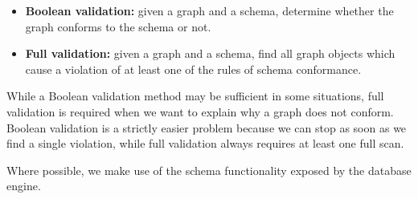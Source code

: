 \documentclass{article}
\theoremstyle{definition}
\begin{document}
\begin{itemize}
  \item \textbf{Boolean validation:} given a graph and a schema, determine whether the graph conforms to the schema or not.
  \item \textbf{Full validation:} given a graph and a schema, find all graph objects which cause a violation of at least one of the rules of schema conformance.
\end{itemize}

While a Boolean validation method may be sufficient in some situations, full validation is required when we want to explain why a graph does not conform. Boolean validation is a strictly easier problem because we can stop as soon as we find a single violation, while full validation always requires at least one full scan.

Where possible, we make use of the schema functionality exposed by the database engine.


\end{document}
